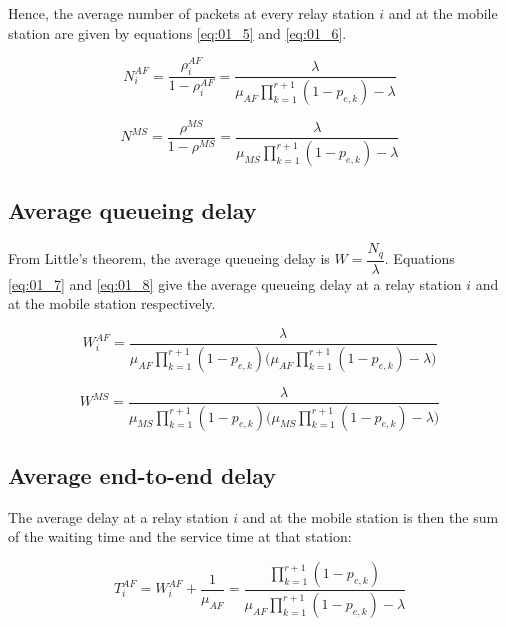 Hence, the average number of packets at every relay station $i$ and at the
mobile station are given by equations \ref{eq:01_5} and \ref{eq:01_6}.

\begin{equation}
  N_i^{AF} = \dfrac{\rho_i^{AF}}{1 - \rho_i^{AF}} = \dfrac{\lambda}{\mu_{AF}\prod\limits_{k=1}^{r+1} (1 - p_{e,k}) - \lambda}
  \label{eq:01_5}
\end{equation}

\begin{equation}
  N^{MS} =  \dfrac{\rho^{MS}}{1 - \rho^{MS}} = \dfrac{\lambda}{\mu_{MS}\prod\limits_{k=1}^{r+1} (1 - p_{e,k}) - \lambda}
  \label{eq:01_6}
\end{equation}


\subsection{Average queueing delay}

From Little's theorem, the average queueing delay is $W = \dfrac{N_q}{\lambda}$.
Equations \ref{eq:01_7} and \ref{eq:01_8} give the average queueing delay at a
relay station $i$ and at the mobile station respectively.

\begin{equation}
  W_i^{AF} = \dfrac{\lambda}{\mu_{AF} \prod\limits_{k=1}^{r+1} (1 - p_{e,k})\Big(\mu_{AF}\prod\limits_{k=1}^{r+1} (1 - p_{e,k}) - \lambda\Big)}
  \label{eq:01_7}
\end{equation}

\begin{equation}
  W^{MS} = \dfrac{\lambda}{\mu_{MS} \prod\limits_{k=1}^{r+1} (1 - p_{e,k})\Big(\mu_{MS}\prod\limits_{k=1}^{r+1} (1 - p_{e,k}) - \lambda\Big)}
  \label{eq:01_8}
\end{equation}


\subsection{Average end-to-end delay}

The average delay at a relay station $i$ and at the mobile station is then the
sum of the waiting time and the service time at that station:

\begin{equation}
  T_i^{AF} = W_i^{AF} + \dfrac{1}{\mu_{AF}} =
  \dfrac{\prod\limits_{k=1}^{r+1} (1 - p_{e,k})}{\mu_{AF}\prod\limits_{k=1}^{r+1} (1 - p_{e,k}) -\lambda}
  \label{eq:01_9}
\end{equation}

